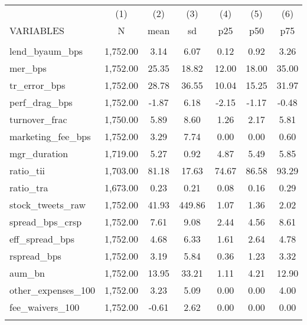 \documentclass[]{article}
\begin{document}
\begin{tabular}{lcccccc} \hline
 & (1) & (2) & (3) & (4) & (5) & (6) \\
VARIABLES & N & mean & sd & p25 & p50 & p75 \\ \hline
 &  &  &  &  &  &  \\
lend\_byaum\_bps & 1,752.00 & 3.14 & 6.07 & 0.12 & 0.92 & 3.26 \\
mer\_bps & 1,752.00 & 25.35 & 18.82 & 12.00 & 18.00 & 35.00 \\
tr\_error\_bps & 1,752.00 & 28.78 & 36.55 & 10.04 & 15.25 & 31.97 \\
perf\_drag\_bps & 1,752.00 & -1.87 & 6.18 & -2.15 & -1.17 & -0.48 \\
turnover\_frac & 1,750.00 & 5.89 & 8.60 & 1.26 & 2.17 & 5.81 \\
marketing\_fee\_bps & 1,752.00 & 3.29 & 7.74 & 0.00 & 0.00 & 0.60 \\
mgr\_duration & 1,719.00 & 5.27 & 0.92 & 4.87 & 5.49 & 5.85 \\
ratio\_tii & 1,703.00 & 81.18 & 17.63 & 74.67 & 86.58 & 93.29 \\
ratio\_tra & 1,673.00 & 0.23 & 0.21 & 0.08 & 0.16 & 0.29 \\
stock\_tweets\_raw & 1,752.00 & 41.93 & 449.86 & 1.07 & 1.36 & 2.02 \\
spread\_bps\_crsp & 1,752.00 & 7.61 & 9.08 & 2.44 & 4.56 & 8.61 \\
eff\_spread\_bps & 1,752.00 & 4.68 & 6.33 & 1.61 & 2.64 & 4.78 \\
rspread\_bps & 1,752.00 & 3.19 & 5.84 & 0.36 & 1.23 & 3.32 \\
aum\_bn & 1,752.00 & 13.95 & 33.21 & 1.11 & 4.21 & 12.90 \\
other\_expenses\_100 & 1,752.00 & 3.23 & 5.09 & 0.00 & 0.00 & 4.00 \\
fee\_waivers\_100 & 1,752.00 & -0.61 & 2.62 & 0.00 & 0.00 & 0.00 \\
 &  &  &  &  &  &  \\ \hline
\end{tabular}
\end{document}
